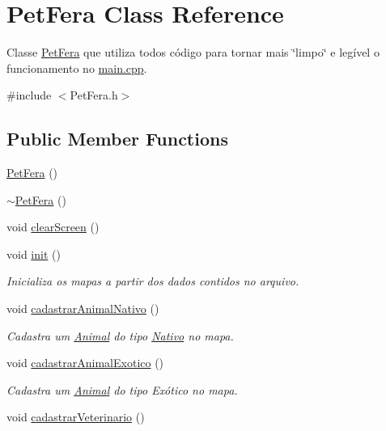 \hypertarget{classPetFera}{}\section{Pet\+Fera Class Reference}
\label{classPetFera}


Classe \hyperlink{classPetFera}{Pet\+Fera} que utiliza todos código para tornar mais \char`\"{}limpo\char`\"{} e legível o funcionamento no \hyperlink{main_8cpp}{main.\+cpp}.  




{\ttfamily \#include $<$Pet\+Fera.\+h$>$}

\subsection*{Public Member Functions}
\begin{DoxyCompactItemize}
\item 
\hyperlink{classPetFera_a1d0a2b0e9d459ee1e526c50e381ff82d}{Pet\+Fera} ()
\item 
\hyperlink{classPetFera_ab6d608548d1032f06571e0a4db8fd797}{$\sim$\+Pet\+Fera} ()
\item 
void \hyperlink{classPetFera_a19adc92934d53fbaa25554836c8d8186}{clear\+Screen} ()
\item 
void \hyperlink{classPetFera_a9fdb130a8f1da55ef04e51e01741c87b}{init} ()
\begin{DoxyCompactList}\small\item\em Inicializa os mapas a partir dos dados contidos no arquivo. \end{DoxyCompactList}\item 
void \hyperlink{classPetFera_ac42995494bfa5873d92e8391d1002f1a}{cadastrar\+Animal\+Nativo} ()
\begin{DoxyCompactList}\small\item\em Cadastra um \hyperlink{classAnimal}{Animal} do tipo \hyperlink{classNativo}{Nativo} no mapa. \end{DoxyCompactList}\item 
void \hyperlink{classPetFera_aa095a83bf3fe053b094020a6b7049f66}{cadastrar\+Animal\+Exotico} ()
\begin{DoxyCompactList}\small\item\em Cadastra um \hyperlink{classAnimal}{Animal} do tipo Exótico no mapa. \end{DoxyCompactList}\item 
void \hyperlink{classPetFera_ad1cf3d95ff0985a9942ae15a9c8692c3}{cadastrar\+Veterinario} ()

\end{DoxyCompactItemize}
